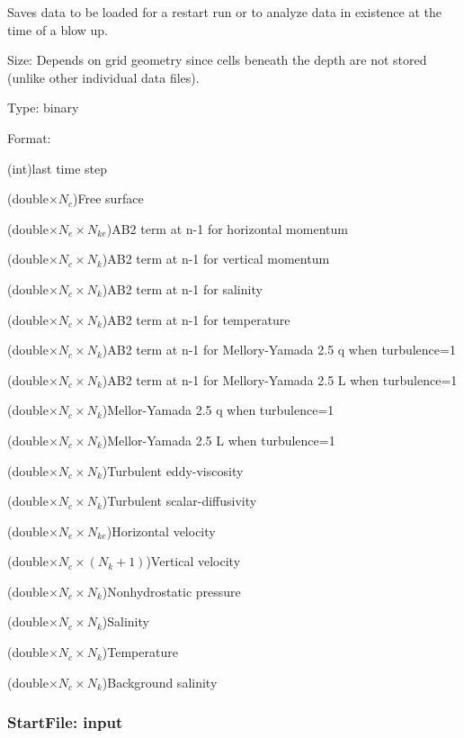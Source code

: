 \documentclass[12pt,oneside]{article}
\begin{document}
Saves data to be loaded for a restart run or to analyze data in existence at the time of
a blow up.    
\begin{list}{}
\item Size: Depends on grid geometry since cells beneath the depth are not stored (unlike other
individual data files).
\item Type: binary
\item Format: 
\begin{list}{}
\item (int)last time step
\item (double$\times N_c$)Free surface
\item (double$\times N_e \times N_{ke}$)AB2 term at n-1 for horizontal momentum 
\item (double$\times N_c \times N_{k}$)AB2 term at n-1 for vertical momentum 
\item (double$\times N_c \times N_{k}$)AB2 term at n-1 for salinity
\item (double$\times N_c \times N_{k}$)AB2 term at n-1 for temperature
\item (double$\times N_c \times N_{k}$)AB2 term at n-1 for Mellory-Yamada 2.5 q when turbulence=1
\item (double$\times N_c \times N_{k}$)AB2 term at n-1 for Mellory-Yamada 2.5 L  when turbulence=1
\item (double$\times N_c \times N_{k}$)Mellor-Yamada 2.5 q  when turbulence=1
\item (double$\times N_c \times N_{k}$)Mellor-Yamada 2.5 L  when turbulence=1
\item (double$\times N_c \times N_{k}$)Turbulent eddy-viscosity
\item (double$\times N_c \times N_{k}$)Turbulent scalar-diffusivity
\item (double$\times N_e \times N_{ke}$)Horizontal velocity
\item (double$\times N_c \times (N_{k}+1)$)Vertical velocity
\item (double$\times N_c \times N_{k}$)Nonhydrostatic pressure 
\item (double$\times N_c \times N_{k}$)Salinity
\item (double$\times N_c \times N_{k}$)Temperature
\item (double$\times N_c \times N_{k}$)Background salinity 
\end{list}
\end{list}

\subsubsection{StartFile: input}
\end{document}
